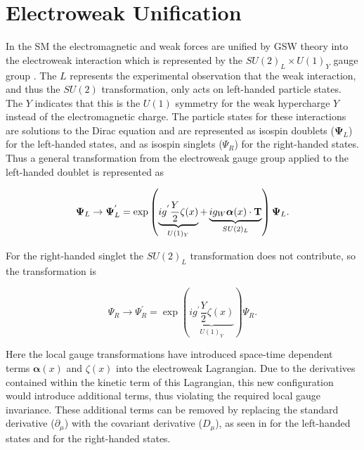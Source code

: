 \section{Electroweak Unification} \label{sec:theory:gsw}

In the SM the electromagnetic and weak forces are unified by GSW theory into
the electroweak interaction which is represented by the $SU(2)_L \times U(1)_Y$
gauge group \cite{Glashow:1961tr, Goldstone:1962es, Weinberg:1967tq}.
The $L$ represents the experimental observation that the weak interaction, and
thus the $SU(2)$ transformation, only acts on left-handed particle states.  The
$Y$ indicates that this is the $U(1)$ symmetry for the weak hypercharge $Y$
instead of the electromagnetic charge.  The particle states for these
interactions are solutions to the Dirac equation and are represented as isospin
doublets ($\boldsymbol{\Psi}_{L}$) for the left-handed states, and as isospin
singlets ($\Psi_R$) for the right-handed states.  Thus a general transformation
from the electroweak gauge group applied to the left-handed doublet is
represented as

\begin{equation} \label{eq:gsw:doublet} 
\boldsymbol{\Psi}_{L} \rightarrow \boldsymbol{\Psi}_{L}^{'} = \exp \left(
\underbrace{ ig^{'} \frac{Y}{2}
\zeta (x) }_{U(1)_Y} + \underbrace{ ig_{W} \boldsymbol{\alpha}(x) \cdot
\text{\bf{T}} }_{SU(2)_L} \right) \boldsymbol{\Psi}_{L}.
\end{equation}

For the right-handed singlet the $SU(2)_L$ transformation does not contribute,
so the transformation is

\begin{equation} \label{eq:gsw:singlet} 
{\Psi_R} \rightarrow \Psi_R^{'} = \exp \left( \underbrace{ ig^{'} \frac{Y}{2}
\zeta (x) }_{U(1)_Y} \right) \Psi_R.
\end{equation}

Here the local gauge transformations have introduced space-time dependent terms
$\boldsymbol{\alpha}(x)$ and $\zeta(x)$ into the electroweak Lagrangian.  Due
to the derivatives contained within the kinetic term of this Lagrangian, this
new configuration would introduce additional terms, thus violating the required
local gauge invariance.  These additional terms can be removed by replacing the
standard derivative ($\partial_{\mu}$) with the covariant derivative
($D_{\mu}$), as seen in  for the left-handed states and
 for the right-handed states.

